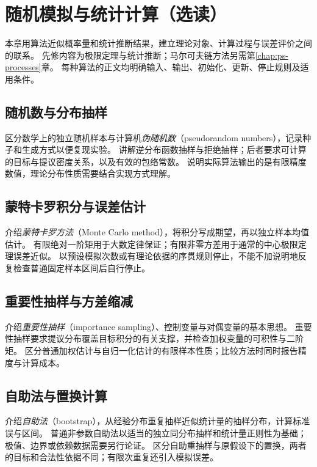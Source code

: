 \setcounter{chapter}{19} %
\chapter{随机模拟与统计计算（选读）}
\label{chap:ps-computation}

本章用算法近似概率量和统计推断结果，建立理论对象、计算过程与误差评价之间的联系。
先修内容为极限定理与统计推断；马尔可夫链方法另需第\ref{chap:ps-processes}章。
每种算法的正文均明确输入、输出、初始化、更新、停止规则及适用条件。

\section{随机数与分布抽样}
\label{sec:ps-random-generation}
区分数学上的独立随机样本与计算机\emph{伪随机数}（pseudorandom numbers），记录种子和生成方式以便复现实验。
讲解逆分布函数抽样与拒绝抽样；后者要求可计算的目标与提议密度关系，以及有效的包络常数。
说明实际算法输出的是有限精度数值，理论分布性质需要结合实现方式理解。

\section{蒙特卡罗积分与误差估计}
\label{sec:ps-monte-carlo}
介绍\emph{蒙特卡罗方法}（Monte Carlo method），将积分写成期望，再以独立样本均值估计。
有限绝对一阶矩用于大数定律保证；有限非零方差用于通常的中心极限定理误差近似。
以预设模拟次数或有理论依据的序贯规则停止，不能不加说明地反复检查普通固定样本区间后自行停止。

\section{重要性抽样与方差缩减}
\label{sec:ps-variance-reduction}
介绍\emph{重要性抽样}（importance sampling）、控制变量与对偶变量的基本思想。
重要性抽样要求提议分布覆盖目标积分的有关支撑，并检查加权变量的可积性与二阶矩。
区分普通加权估计与自归一化估计的有限样本性质；比较方法时同时报告精度与计算成本。

\section{自助法与置换计算}
\label{sec:ps-bootstrap}
介绍\emph{自助法}（bootstrap），从经验分布重复抽样近似统计量的抽样分布，计算标准误与区间。
普通非参数自助法以适当的独立同分布抽样和统计量正则性为基础；极值、边界或依赖数据需要另行论证。
区分自助重抽样与原假设下的置换，两者的目标和合法性依据不同；有限次重复还引入模拟误差。

